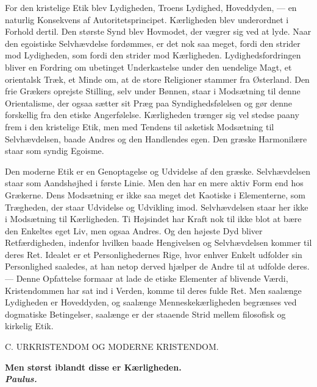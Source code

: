 \documentclass[12pt,a4paper,openany]{book}
\newcommand{\opage}[1]{\marginnote{\footnotesize\textit{[#1]}}}
\begin{document}
For den kristelige Etik blev Lydigheden, Troens Lydighed, Hoveddyden,
--- en naturlig Konsekvens af Autoritetsprincipet. Kærligheden blev
underordnet i Forhold dertil. Den største Synd blev Hovmodet, der vægrer
sig ved at lyde. Naar den egoistiske Selvhævdelse fordømmes, er det nok
saa meget, fordi den strider mod Lydigheden, som fordi den strider mod
Kærligheden. Lydighedsfordringen bliver en Fordring om ubetinget
Underkastelse under den uendelige Magt, et orientalsk Træk, et Minde om,
at de store Religioner stammer fra Østerland. Den frie Grækers oprejste
Stilling, selv under Bønnen, staar i Modsætning til denne Orientalisme,
der ogsaa sætter sit Præg paa Syndighedsfølelsen og gør denne forskellig
fra den etiske Angerfølelse. Kærligheden trænger sig vel stedse paany
frem i den kristelige Etik, men med Tendens til asketisk Modsætning til
Selvhævdelsen, baade Andres og den Handlendes egen. Den græske
Harmonilære staar som syndig Egoisme.

Den moderne Etik er en Genoptagelse og Udvidelse af den græske.
Selvhævdelsen staar som Aandshøjhed i første Linie. Men den har en mere
aktiv Form end hos Grækerne. Dens Modsætning er ikke saa meget det
Kaotiske i Elementerne, som Trægheden, der staar Udvidelse og Udvikling
imod. Selvhævdelsen staar her ikke i Modsætning til Kærligheden. Ti
Højsindet har Kraft nok til ikke blot at bære den Enkeltes eget Liv, men
ogsaa Andres. Og den højeste Dyd bliver Retfærdigheden, indenfor hvilken
baade Hengivelsen og Selvhævdelsen kommer til deres Ret. Idealet er et
Personlighedernes Rige, hvor enhver Enkelt udfolder sin Personlighed
saaledes, at han netop derved hjælper de
\opage{228}Andre til at udfolde deres. --- Denne Opfattelse formaar at
lade de etiske Elementer af blivende Værdi, Kristendommen har sat ind i
Verden, komme til deres fulde Ret. Men saalænge Lydigheden er
Hoveddyden, og saalænge Menneskekærligheden begrænses ved dogmatiske
Betingelser, saalænge er der staaende Strid mellem filosofisk og
kirkelig Etik.

\clearpage

\opage{229}\begin{center}C. URKRISTENDOM OG MODERNE KRISTENDOM.\end{center}

\begin{flushright}\begin{minipage}{0.55\textwidth}\small\bfseries
Men størst iblandt disse er Kærligheden.\\
\hfill\textit{Paulus.}
\end{minipage}\end{flushright}
\end{document}
